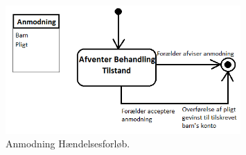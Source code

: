 \begin{figure}[H]
\centering
\includegraphics[width=0.8\textwidth]{Billeder/AnmodningForloeb.png}
\caption{Anmodning Hændelsesforløb.}
\label{AnmodningHaendelsesforloeb}
\end{figure}
